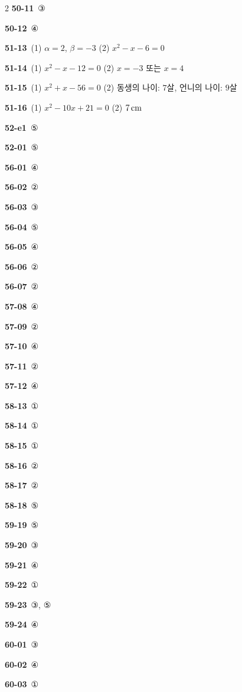 \documentclass[10pt,a4paper]{article}
\begin{document}
\begin{multicols}{2}
\noindent\textbf{50-11}\ ③\par
\noindent\textbf{50-12}\ ④\par
\noindent\textbf{51-13}\ (1) $\alpha=2$, $\beta=-3$ (2) $x^2-x-6=0$\par
\noindent\textbf{51-14}\ (1) $x^2-x-12=0$ (2) $x=-3$ 또는 $x=4$\par
\noindent\textbf{51-15}\ (1) $x^2+x-56=0$ (2) 동생의 나이: $7$살, 언니의 나이: $9$살\par
\noindent\textbf{51-16}\ (1) $x^2-10x+21=0$ (2) $7\mkern3mu \mathrm{cm}$\par
\noindent\textbf{52-e1}\ ⑤\par
\noindent\textbf{52-01}\ ⑤\par
\noindent\textbf{56-01}\ ④\par
\noindent\textbf{56-02}\ ②\par
\noindent\textbf{56-03}\ ③\par
\noindent\textbf{56-04}\ ⑤\par
\noindent\textbf{56-05}\ ④\par
\noindent\textbf{56-06}\ ②\par
\noindent\textbf{56-07}\ ②\par
\noindent\textbf{57-08}\ ④\par
\noindent\textbf{57-09}\ ②\par
\noindent\textbf{57-10}\ ④\par
\noindent\textbf{57-11}\ ②\par
\noindent\textbf{57-12}\ ④\par
\noindent\textbf{58-13}\ ①\par
\noindent\textbf{58-14}\ ①\par
\noindent\textbf{58-15}\ ①\par
\noindent\textbf{58-16}\ ②\par
\noindent\textbf{58-17}\ ②\par
\noindent\textbf{58-18}\ ⑤\par
\noindent\textbf{59-19}\ ⑤\par
\noindent\textbf{59-20}\ ③\par
\noindent\textbf{59-21}\ ④\par
\noindent\textbf{59-22}\ ①\par
\noindent\textbf{59-23}\ ③, ⑤\par
\noindent\textbf{59-24}\ ④\par
\noindent\textbf{60-01}\ ③\par
\noindent\textbf{60-02}\ ④\par
\noindent\textbf{60-03}\ ①\par

\end{multicols}
\end{document}
